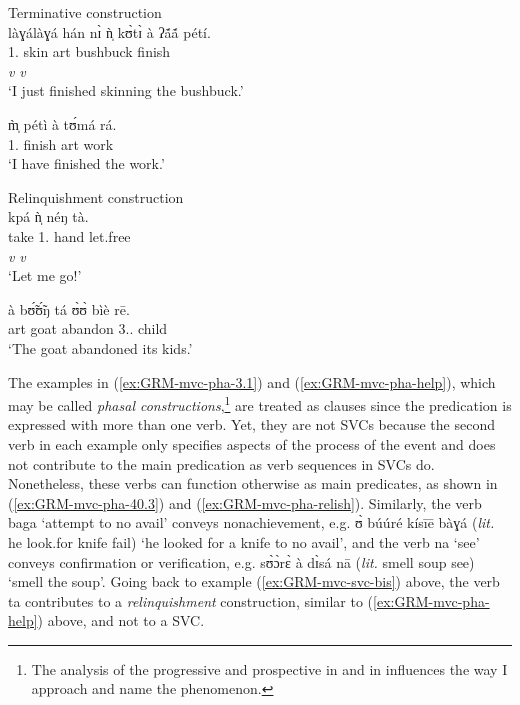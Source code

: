 \ea\label{ex:GRM-mvc-phase}

\ea\label{ex:GRM-mvc-pha-3.1} {\rm Terminative construction}\\
\glll làɣálàɣá hán nɪ̀ ǹ̩ kʊ̀tɪ̀ à ʔã́ã́ pétí.\\
{\ideo} {\dem} {\postp} {1.\sg} {skin} {\sc art} bushbuck  finish\\
{} {} {} {}  {\it v} {} {} {\it v}\\
\glt `I  just finished skinning the bushbuck.'

\ex\label{ex:GRM-mvc-pha-40.3}
\gll  m̩̀ pétì à tʊ́má rá.\\
{1.\sg} finish {\sc art} work {\foc}\\
\glt `I have finished the work.'


\ex\label{ex:GRM-mvc-pha-help}{\rm Relinquishment construction}\\
\glll  kpá ǹ̩ néŋ tà.\\
take {1.\sg} hand let.free\\
 {\it v} {}  {} {\it v}\\
\glt `Let me go!'

\ex\label{ex:GRM-mvc-pha-relish} 
\gll  à bʊ̃́ʊ̃́ŋ tá ʊ̀ʊ̀ bìè rē.\\
{\sc art} goat abandon {3.\sg.\poss} child {\foc}\\
\glt `The goat abandoned its kids.'

\z 
 \z

The examples  in (\ref{ex:GRM-mvc-pha-3.1}) and (\ref{ex:GRM-mvc-pha-help}),
which may be called  {\it phasal  constructions},\footnote{The analysis of the
progressive and prospective in  and  in \citet{Amek08} influences the
way I approach and name the phenomenon.}  are treated as  clauses
since the predication is expressed with more than one verb. Yet, they are not
SVCs because the second verb in each example only specifies aspects of the
process
of the event  and does not contribute to the main predication as verb sequences
in SVCs do. Nonetheless, these verbs can function otherwise as main predicates,
as shown in (\ref{ex:GRM-mvc-pha-40.3}) and (\ref{ex:GRM-mvc-pha-relish}).
Similarly, the verb {\sls baga} `attempt to no avail'  conveys
nonachievement, e.g. {\sls ʊ̀ búúré kísīē bàɣá} ({\it lit.} he look.for knife 
fail) 
`he looked for a knife to no avail',  and the verb {\sls na} `see' conveys confirmation 
or
verification, e.g. {\sls sʊ̀ɔ̀rɛ̀ à dɪ̀sá nā} ({\it lit.} smell soup see) `smell the
soup'. Going back to example (\ref{ex:GRM-mvc-svc-bis}) above, the verb {\sls ta}
contributes to a {\it relinquishment}  construction, similar to
(\ref{ex:GRM-mvc-pha-help}) above, and not to a SVC. 
 
